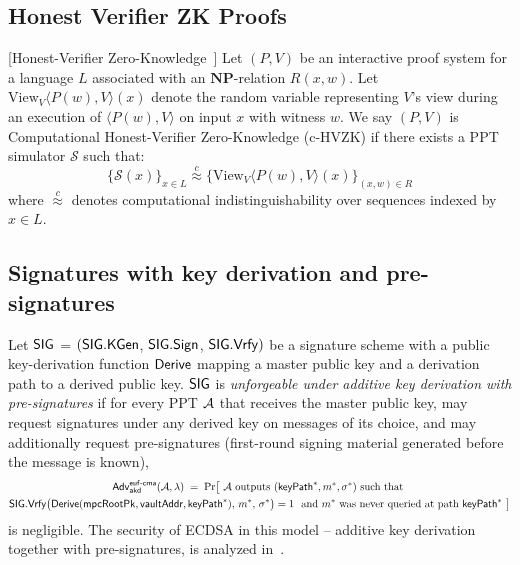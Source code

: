 \subsection{Honest Verifier ZK Proofs}
\begin{definition}\label{def:hvzk}[Honest-Verifier Zero-Knowledge~\cite{JC:GolOre94}]
Let $(P, V)$ be an interactive proof system for a language $L$ associated with an $\mathbf{NP}$-relation $R(x, w)$. Let $\mathrm{View}_V\langle P(w), V \rangle(x)$ denote the random variable representing $V$'s view during an execution of $\langle P(w), V \rangle$ on input $x$ with witness $w$. We say $(P, V)$ is Computational Honest-Verifier Zero-Knowledge (\textsf{c-HVZK}) if there exists a \textsf{PPT} simulator $\mathcal{S}$ such that:
\[
\{ \mathcal{S}(x) \}_{x \in L} \stackrel{c}{\approx} \{ \mathrm{View}_V\langle P(w), V \rangle(x) \}_{(x,w) \in R}
\]
where $\stackrel{c}{\approx}$ denotes computational indistinguishability over sequences indexed by $x \in L$.
\end{definition}





\subsection{Signatures with key derivation and pre-signatures}
\label{ssec:sigdef}

\begin{definition}
\label{def:sig}
Let $\mathsf{SIG}$ = $(\mathsf{SIG.KGen}$, $\mathsf{SIG.Sign}$, $\mathsf{SIG.Vrfy})$ be a signature scheme with a public key-derivation function
$\mathsf{Derive}$ mapping a master public key and a derivation path to a derived public key. $\mathsf{SIG}$ is
\emph{unforgeable under additive key derivation with pre-signatures} if for every PPT $\mathcal{A}$ that
receives the master public key, may request signatures under any derived key on messages of its
choice, and may additionally request pre-signatures (first-round signing material generated before
the message is known),
\begin{multline*}
\mathsf{Adv}^{\mathsf{euf\text{-}cma}}_{\mathsf{akd}}(\mathcal{A},\lambda) \;=\;
\Pr\bigl[\ \mathcal{A} \text{ outputs } (\mathsf{keyPath}^*, m^*, \sigma^*) \text{ such that }\\
\mathsf{SIG.Vrfy}\bigl(\mathsf{Derive}(\mathsf{mpcRootPk}, \mathsf{vaultAddr}, \mathsf{keyPath}^*),\, m^*,\, \sigma^*\bigr) = 1
\ \text{ and } m^* \text{ was never queried at path } \mathsf{keyPath}^*\ \bigr]
\end{multline*}
is negligible. The security of ECDSA in  this model -- additive key derivation together with
pre-signatures,  is analyzed
in~\cite{GrothShoup22}.
\end{definition}








